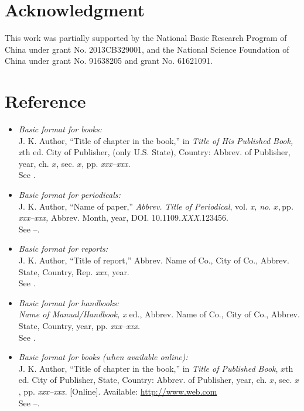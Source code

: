 \documentclass{ieeeaccess}
\begin{document}
\section*{Acknowledgment}

This work was partially supported by the National Basic Research Program of China under grant No. 2013CB329001, and
the National Science Foundation of China under grant No. 91638205 and grant No. 61621091.

\section{Reference}

\begin{itemize}

\item \emph{Basic format for books:}\\
J. K. Author, ``Title of chapter in the book,'' in \emph{Title of His Published Book, x}th ed. City of Publisher, (only U.S. State), Country: Abbrev. of Publisher, year, ch. $x$, sec. $x$, pp. \emph{xxx--xxx.}\\
See \cite{b1,b2}.

\item \emph{Basic format for periodicals:}\\
J. K. Author, ``Name of paper,'' \emph{Abbrev. Title of Periodical}, vol. \emph{x, no}. $x, $pp\emph{. xxx--xxx, }Abbrev. Month, year, DOI. 10.1109.\emph{XXX}.123456.\\
See \cite{b3}--\cite{b5}.

\item \emph{Basic format for reports:}\\
J. K. Author, ``Title of report,'' Abbrev. Name of Co., City of Co., Abbrev. State, Country, Rep. \emph{xxx}, year.\\
See \cite{b6,b7}.

\item \emph{Basic format for handbooks:}\\
\emph{Name of Manual/Handbook, x} ed., Abbrev. Name of Co., City of Co., Abbrev. State, Country, year, pp. \emph{xxx--xxx.}\\
See \cite{b8,b9}.

\item \emph{Basic format for books (when available online):}\\
J. K. Author, ``Title of chapter in the book,'' in \emph{Title of
Published Book}, $x$th ed. City of Publisher, State, Country: Abbrev.
of Publisher, year, ch. $x$, sec. $x$, pp. \emph{xxx--xxx}. [Online].
Available: \underline{http://www.web.com}\\
See \cite{b10}--\cite{b13}.


\end{itemize}
\end{document}
